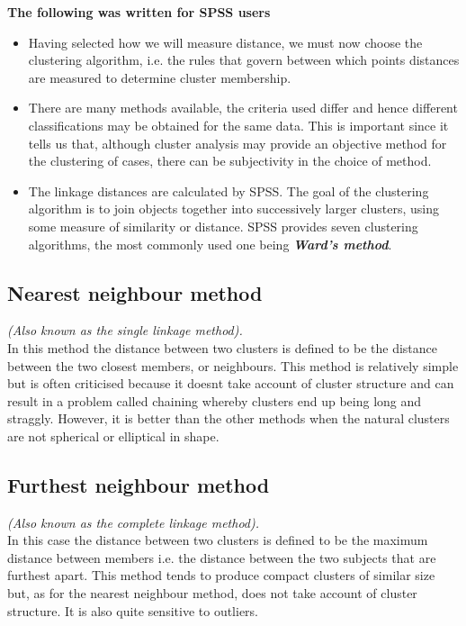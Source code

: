 \documentclass[SKLCluster.tex]{subfiles}
\begin{document}
\textbf{The following was written for SPSS users} \\
\begin{itemize}
\item Having selected how we will measure distance, we must now choose the clustering algorithm, i.e. the rules that govern between which points distances are measured to determine cluster membership. 

\item There are many methods available, the criteria used differ and hence
different classifications may be obtained for the same data. This is important since it tells us that, although cluster analysis may provide an objective method for the clustering of cases, there can be subjectivity in the choice of method. 

\item The linkage distances are calculated by SPSS. The goal of the clustering algorithm is to join objects together into successively larger clusters, using some measure of similarity or distance. SPSS provides seven clustering algorithms, the most commonly used one being  \textbf{\textit{Ward's method}}.
\end{itemize}

\subsection{Nearest neighbour method} \textit{
(Also known as the single linkage method).\\}
In this method the distance between two clusters is defined to be the distance between
the two closest members, or neighbours. This method is relatively simple but is often
criticised because it doesnt take account of cluster structure and can result in a problem
called chaining whereby clusters end up being long and straggly. However, it is better
than the other methods when the natural clusters are not spherical or elliptical in shape.

\subsection{Furthest neighbour method}\textit{
(Also known as the complete linkage method).\\}
In this case the distance between two clusters is defined to be the maximum distance
between members  i.e. the distance between the two subjects that are furthest apart.
This method tends to produce compact clusters of similar size but, as for the nearest
neighbour method, does not take account of cluster structure. It is also quite sensitive
to outliers.
\end{document}

